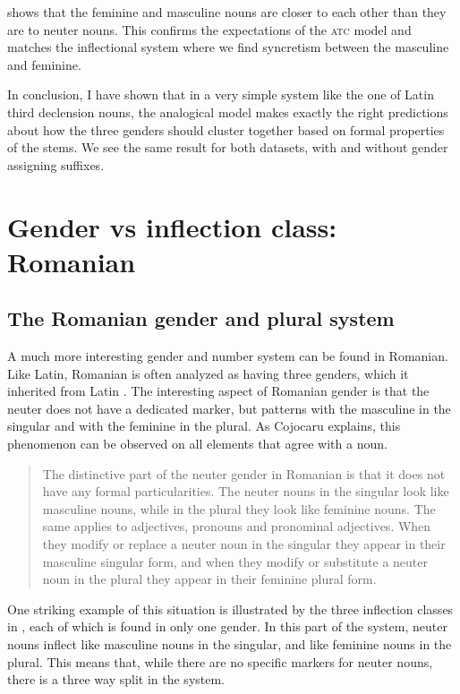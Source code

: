  shows that the feminine and masculine nouns are closer to each other than they are to neuter nouns. This confirms the expectations of the \textsc{atc} model and matches the inflectional system where we find syncretism between the masculine and feminine.

In conclusion, I have shown that in a very simple system like the one of Latin third declension nouns, the analogical model makes exactly the right predictions about how the three genders should cluster together based on formal properties of the stems. We see the same result for both datasets, with and without gender assigning suffixes.


\section{Gender vs inflection class: Romanian}

\subsection{The Romanian gender and plural system}


A much more interesting gender and number system can be found in Romanian. Like Latin, Romanian is often analyzed as having three genders, which it inherited from Latin \autocite[23]{Gonczol.2007}. The interesting aspect of Romanian gender is that the neuter does not have a dedicated marker, but patterns with the masculine in the singular and with the feminine in the plural. As Cojocaru explains, this phenomenon can be observed on all elements that agree with a noun. 

\begin{quotation}
The distinctive part of the neuter gender in Romanian is that it does not have any formal particularities. The neuter nouns in the singular look like masculine nouns, while in the plural they look like feminine nouns. The same applies to adjectives, pronouns and pronominal adjectives. When they modify or replace a neuter noun in the singular they appear in their masculine singular form, and when they modify or substitute a neuter noun in the plural they appear in their feminine plural form. \autocite[27]{Cojocaru.2003}
\end{quotation}

One striking example of this situation is illustrated by the three inflection classes in , each of which is found in only one gender. In this part of the system, neuter nouns inflect like masculine nouns in the singular, and like feminine nouns in the plural. This means that, while there are no specific markers for neuter nouns, there is a three way split in the system.

